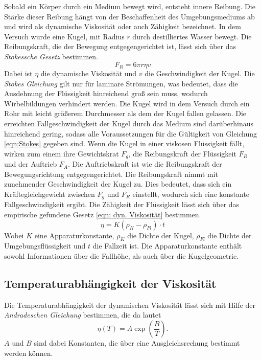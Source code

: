 Sobald ein Körper durch ein Medium bewegt wird, entsteht innere Reibung. Die Stärke dieser Reibung hängt von der Beschaffenheit
des Umgebungsmediums ab und wird als dynamische Viskosität oder auch Zähigkeit bezeichnet.
In dem Versuch wurde eine Kugel, mit Radius $r$ durch destilliertes Wasser bewegt. Die Reibungskraft, die der Bewegung
entgegengerichtet ist, lässt sich über das \emph{Stokessche Gesetz} bestimmen.
\begin{equation}
  \label{eqn:Stokes}
  F_R = 6\pi r \eta v
\end{equation}
Dabei ist $\eta$ die dynamische Viskosität und $v$ die Geschwindigkeit der Kugel. Die \emph{Stokes Gleichung} gilt nur für laminare
Strömungen, was bedeutet, dass die Ausdehnung der Flüssigkeit hinreichend groß sein muss, wodurch Wirbelbildungen verhindert werden.
Die Kugel wird in dem Versuch durch ein Rohr mit leicht größerem Durchmesser als dem der Kugel fallen gelassen.
Die erreichten Fallgeschwindigkeit der Kugel durch das Medium sind darüberhinaus hinreichend gering, sodass
alle Voraussetzungen für die Gültigkeit von Gleichung \eqref{eqn:Stokes} gegeben sind.
Wenn die Kugel in einer viskosen Flüssigkeit fällt, wirken zum einem ihre Gewichtskrat $F_g$, die Reibungskraft der Flüssigkeit $F_R$
und der Auftrieb $F_A$. Die Auftriebskraft ist wie die Reibungskraft der Bewegungsrichtung entgegengerichtet.
Die Reibungskraft nimmt mit zunehmender Geschwindigkeit der Kugel zu. Dies bedeutet, dass sich ein Kräftegleichgewicht zwischen
$F_g$ und $F_R$ einstellt, wodurch sich eine konstante Fallgeschwindigkeit ergibt.
Die Zähigkeit der Flüssigkeit lässt sich über das empirische gefundene Gesetz \eqref{eqn: dyn. Viskosität} bestimmen.
\begin{equation}
  \label{eqn: dyn. Viskosität}
  \eta = K(\rho_K - \rho_{Fl}) \cdot t
\end{equation}
Wobei $K$ eine Apparaturkonstante, $\rho_K$ die Dichte der Kugel, $\rho_{Fl}$ die Dichte der Umgebungsflüssigkeit und $t$ die Fallzeit ist.
Die Apparaturkonstante enthält sowohl Informationen über die Fallhöhe, als auch über die Kugelgeometrie.

\subsection{Temperaturabhängigkeit der Viskosität}

Die Temperaturabhängigkeit der dynamischen Viskosität lässt sich mit Hilfe der \emph{Andradeschen Gleichung} bestimmen, die da lautet
\begin{equation}
  \eta(T) = A \exp\left(\frac{B}{T}\right).
\end{equation}
$A$ und $B$ sind dabei Konstanten, die über eine Ausgleichsrechung bestimmt werden können.

